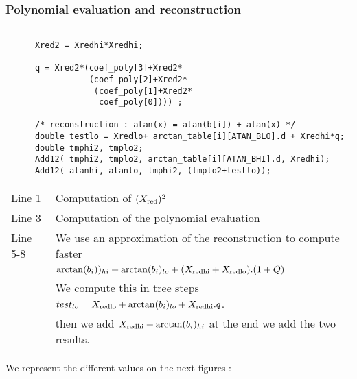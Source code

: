 \subsubsection{Polynomial evaluation and reconstruction}

\begin{lstlisting}[caption={Polynomial Evaluation and recontruction},firstnumber=1]

      Xred2 = Xredhi*Xredhi;

      q = Xred2*(coef_poly[3]+Xred2*
                 (coef_poly[2]+Xred2*
                  (coef_poly[1]+Xred2*
                   coef_poly[0]))) ;

      /* reconstruction : atan(x) = atan(b[i]) + atan(x) */
      double testlo = Xredlo+ arctan_table[i][ATAN_BLO].d + Xredhi*q;
      double tmphi2, tmplo2;
      Add12( tmphi2, tmplo2, arctan_table[i][ATAN_BHI].d, Xredhi);
      Add12( atanhi, atanlo, tmphi2, (tmplo2+testlo));

\end{lstlisting}

\begin{tabular}{ll}
Line 1 & Computation of $(X_{\mathrm{red}})^2$\\
Line 3 & Computation of the polynomial evaluation\\
Line 5-8 & We use an approximation of the reconstruction to compute faster  \\
       & $\arctan(b_i))_{hi}+\arctan(b_i)_{lo} +
        (X_{\mathrm{red hi}}+X_{\mathrm{red lo}}).(1+Q)$\\
       & We compute this in tree steps $test_{lo}= X_{\mathrm{red lo}}+ \arctan(b_i)_{lo}
        + X_{\mathrm{red hi}}.q$.\\
       & then we add $X_{\mathrm{red hi}}+\arctan(b_i)_{hi}$ at the end we add the two results.\\
\end{tabular}

We represent the different values on the next figures :

